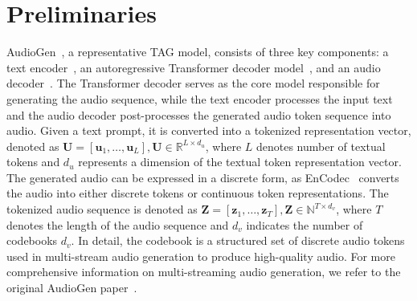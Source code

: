 \section{Preliminaries}
AudioGen~\cite{kreuk2022audiogen}, a representative TAG model, consists of three key components: a text encoder~\cite{raffel2020exploring}, an autoregressive Transformer decoder model~\cite{vaswani2017attention}, and an audio decoder~\cite{defossez2022high}. The Transformer decoder serves as the core model responsible for generating the audio sequence, while the text encoder processes the input text and the audio decoder post-processes the generated audio token sequence into audio. Given a text prompt, it is converted into a tokenized representation vector, denoted as $\textbf{U} = [\textbf{u}_{1}, \dots, \textbf{u}_{L}], \textbf{U} \in \mathbb{R}^{L \times d_{u}}$, where $L$ denotes number of textual tokens and $d_{u}$ represents a dimension of the textual token representation vector. The generated audio can be expressed in a discrete form, as EnCodec~\cite{defossez2022high} converts the audio into either discrete tokens or continuous token representations. The tokenized audio sequence is denoted as $\textbf{Z} = [\textbf{z}_{1}, \dots, \textbf{z}_{T}], \textbf{Z} \in \mathbb{N}^{T \times d_{v}}$, where $T$ denotes the length of the audio sequence and $d_{v}$ indicates the number of codebooks $d_{v}$. In detail, the codebook is a structured set of discrete audio tokens used in multi-stream audio generation to produce high-quality audio. For more comprehensive information on multi-streaming audio generation, we refer to the original AudioGen paper~\cite{kreuk2022audiogen}. 

